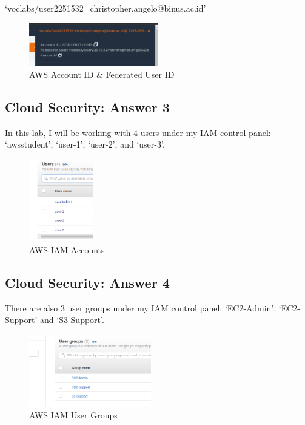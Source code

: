 \documentclass[
  11pt, %
]{assignment}
\begin{document}
`voclabs/user2251532=christopher.angelo@binus.ac.id'

\begin{figure}[H]
	\centering
	\includegraphics[width=0.5\textwidth]{graphics/section3/AccountId.png}
	\caption{AWS Account ID \& Federated User ID}\label{fig:accid}
\end{figure}

\pagebreak

\subsection*{Cloud Security: Answer 3}

In this lab, I will be working with 4 users under my IAM control panel: `awsstudent', `user-1', `user-2', and `user-3'.

\begin{figure}[H]
	\centering
	\includegraphics[width=0.25\textwidth]{graphics/section3/IAMUsers.png}
	\caption{AWS IAM Accounts}\label{fig:iamacc}
\end{figure}

\subsection*{Cloud Security: Answer 4}

There are also 3 user groups under my IAM control panel: `EC2-Admin', `EC2-Support' and `S3-Support'.

\begin{figure}[H]
	\centering
	\includegraphics[width=0.475\textwidth]{graphics/section3/IAMUserGroups.png}
	\caption{AWS IAM User Groups}\label{fig:iamusergroup}
\end{figure}
\end{document}
